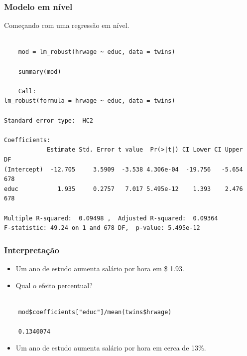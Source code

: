\documentclass[10pt,slides,xcolor=pdftex,dvipsnames,table]{beamer}
\begin{document}

\begin{frame}[fragile]
	\frametitle{Modelo em nível}

\vspace{0.5cm}
Começando com uma regressão em nível.

\begin{lstlisting}

	mod = lm_robust(hrwage ~ educ, data = twins)
	
	summary(mod)
	
	Call:
lm_robust(formula = hrwage ~ educ, data = twins)

Standard error type:  HC2 

Coefficients:
            Estimate Std. Error t value  Pr(>|t|) CI Lower CI Upper  DF
(Intercept)  -12.705     3.5909  -3.538 4.306e-04  -19.756   -5.654 678
educ           1.935     0.2757   7.017 5.495e-12    1.393    2.476 678

Multiple R-squared:  0.09498 ,	Adjusted R-squared:  0.09364 
F-statistic: 49.24 on 1 and 678 DF,  p-value: 5.495e-12

\end{lstlisting}

\end{frame}


\begin{frame}[fragile]
	\frametitle{Interpretação}

\begin{itemize}\itemsep1.2em

\item Um ano de estudo aumenta salário por hora em \$ 1.93. 

\item Qual o efeito percentual?  

\end{itemize}

\begin{lstlisting}

	mod$coefficients["educ"]/mean(twins$hrwage)
	
	0.1340074

\end{lstlisting}

\begin{itemize}\itemsep1.2em

\item Um ano de estudo aumenta salário por hora em cerca de 13\%.   

\end{itemize}

\end{frame}
\end{document}
